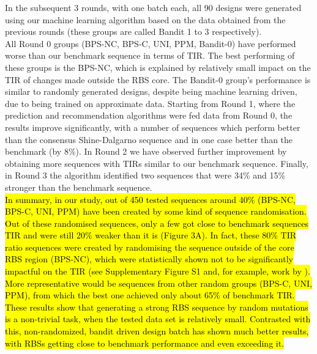 \documentclass{article}
\begin{document}
In the subsequent 3 rounds, with one batch each, all 90 designs were generated using our machine learning algorithm based on the data obtained from the previous rounds (these groups are called Bandit 1 to 3 respectively).\\

All Round 0 groups (BPS-NC, BPS-C, UNI, PPM, Bandit-0) have performed worse than our benchmark sequence in terms of TIR.
The best performing of these groups is the BPS-NC, which is explained by relatively small impact on the TIR of changes made outside the RBS core.
The Bandit-0 group's performance is similar to randomly generated designs, despite being machine learning driven, due to being trained on approximate data.
Starting from Round 1, where the prediction and recommendation algorithms were fed data from Round 0, the results improve significantly, with a number of sequences which perform better than the consensus Shine-Dalgarno sequence and in one case better than the benchmark (by 8\%).
In Round 2 we have observed further improvement by obtaining more sequences with TIRs similar to our benchmark sequence.
Finally, in Round 3 the algorithm identified two sequences that were 34\% and 15\% stronger than the benchmark sequence.\\

\hl{In summary, in our study, out of 450 tested sequences around 40\% (BPS-NC, BPS-C, UNI, PPM) have been created by some kind of sequence randomisation. Out of these randomised sequences, only a few got close to benchmark sequences TIR and were still 20\% weaker than it is (Figure 3A). In fact, these 80\% TIR ratio sequences were created by randomising the sequence outside of the core RBS region (BPS-NC), which were statistically shown not to be significantly impactful on the TIR (see Supplementary Figure S1 and, for example, work by \mbox{\textcite{Jeschek2016}}). More representative would be sequences from other random groups (BPS-C, UNI, PPM), from which the best one achieved only about 65\% of benchmark TIR.
These results show that generating a strong RBS sequence by random mutations is a non-trivial task, when the tested data set is relatively small.
Contrasted with this, non-randomized, bandit driven design batch has shown much better results, with RBSs getting close to benchmark performance and even exceeding it. }\\
\end{document}
